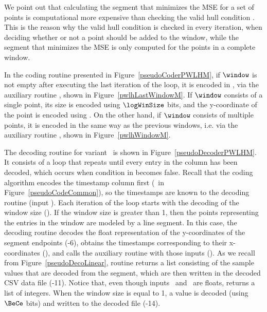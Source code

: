 


We point out that calculating the segment that minimizes the MSE for a set of points is computational more expensive than checking the valid hull condition \cite{AnEva2013}. This is the reason why the valid hull condition is checked in every iteration, when deciding whether or not a point should be added to the window, while the segment that minimizes the MSE is only computed for the points in a complete window.


In the coding routine presented in Figure~\ref{pseudoCoderPWLHM}, if $\window$ is not empty after executing the last iteration of the loop, it is encoded in , via the auxiliary routine \EncodeLastWindowPWLH, shown in Figure~\ref{pwlhLastWindowM}. If $\window$ consists of a single point, its size is encoded using $\logWinSize$ bits, and the y-coordinate of the point is encoded using \tobitexp. On the other hand, if $\window$ consists of multiple points, it is encoded in the same way as the previous windows, i.e. via the auxiliary routine \EncodeWindow, shown in Figure~\ref{pwlhWindowM}.





\vspace{+5pt}
The decoding routine for variant \maskalgo\ is shown in Figure~\ref{pseudoDecoderPWLHM}. It consists of a loop that repeats until every entry in the column has been decoded, which occurs when condition in  becomes false. Recall that the coding algorithm encodes the timestamp column first (\Line \gapLine\ in Figure~\ref{pseudoCodeCommon}), so the timestamps are known to the decoding routine (input \tscol). Each iteration of the loop starts with the decoding of the window size (). If the window size is greater than 1, then the points representing the entries in the window are modeled by a line segment. In this case, the decoding routine decodes the float representation of the y-coordinates of the segment endpoints (-6), obtains the timestamps corresponding to their x-coordinates (), and calls the auxiliary routine \decodeSegment with those inputs (). As we recall from Figure~\ref{pseudoDecoLinear}, routine \decodeSegment returns a list consisting of the sample values that are decoded from the segment, which are then written in the decoded CSV data file (-11). Notice that, even though inputs \sO\ and \sN\ are floats, \decodeSegment returns a list of integers. When the window size is equal to 1, a value is decoded (using $\BeCe$ bits) and written to the decoded file (-14).


